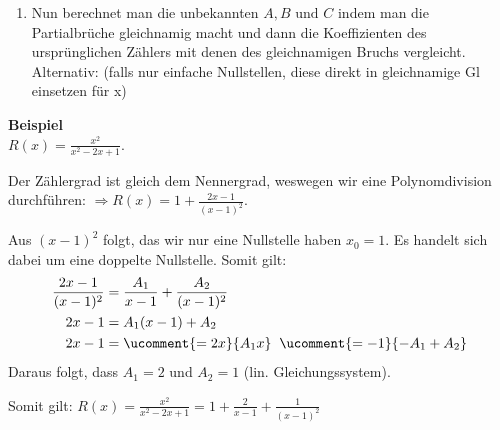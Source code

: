 \begin{enumerate}[leftmargin=*]
\begin{enumerate}[leftmargin=0.3cm]
		
	\end{enumerate}
	\item Nun berechnet man die unbekannten $A, B \text{ und } C$ indem man die Partialbrüche
	gleichnamig macht und dann die Koeffizienten des ursprünglichen Zählers mit
	denen des gleichnamigen Bruchs vergleicht. Alternativ: (falls nur einfache Nullstellen, diese 
	direkt in gleichnamige Gl einsetzen für x)
\end{enumerate}

\textbf{Beispiel}\\
$R(x) = \frac{x^2}{x^2-2x+1}$.

Der Zählergrad ist gleich dem Nennergrad,
weswegen wir eine Polynomdivision durchführen: $\Rightarrow R(x) = 1 +
\frac{2x-1}{(x-1)^2}$.

Aus $(x-1)^2$ folgt, das wir nur eine Nullstelle haben $x_0 = 1$. Es handelt
sich dabei um eine doppelte Nullstelle. Somit gilt:
\begin{align*}
\frac{2x-1}{(x-1)^2} &= \frac{A_1}{x-1} + \frac{A_2}{(x-1)^2}\\
2x-1 &= A_1(x-1) + A_2\\
2x-1 &= \ucomment{= 2x}{A_1 x} \;\; \ucomment{= -1 }{- A_1 + A_2}
\end{align*}
Daraus folgt, dass $A_1 = 2$ und $A_2 = 1$ (lin. Gleichungssystem).

Somit gilt: $R(x) = \frac{x^2}{x^2-2x+1} = 1 + \frac{2}{x-1} +
\frac{1}{(x-1)^2}$
\vfill
\pagebreak